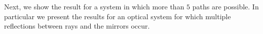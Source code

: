 Next, we show the result for a system in which more than $5$ paths are possible. 
In particular we present the results for an optical system for which multiple reflections between rays and the mirrors occur.
